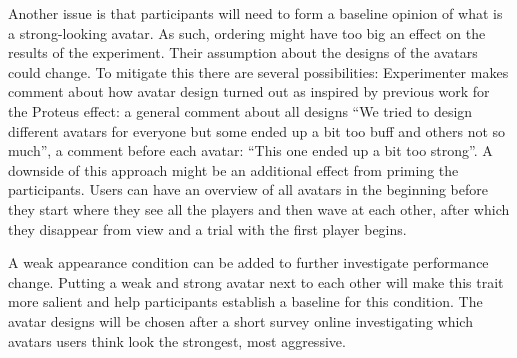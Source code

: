 Another issue is that participants will need to form a baseline opinion of what is a strong-looking avatar. As such, ordering might have too big an effect on the results of the experiment. Their assumption about the designs of the avatars could change. To mitigate this there are several possibilities:
Experimenter makes comment about how avatar design turned out as inspired by previous work for the Proteus effect: a general comment about all designs “We tried to design different avatars for everyone but some ended up a bit too buff and others not so much”, a comment before each avatar: “This one ended up a bit too strong”. A downside of this approach might be an additional effect from priming the participants.
Users can have an overview of all avatars in the beginning before they start where they see all the players and then wave at each other, after which they disappear from view and a trial with the first player begins. 

A weak appearance condition can be added to further investigate performance change. Putting a weak and strong avatar next to each other will make this trait more salient and help participants establish a baseline for this condition. The avatar designs will be chosen after a short survey online investigating which avatars users think look the strongest, most aggressive. 
